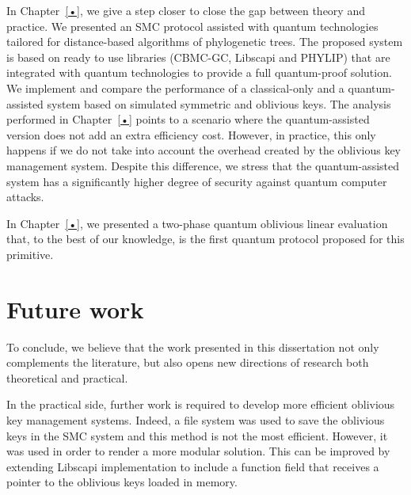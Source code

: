 In Chapter~\ref{•}, we give a step closer to close the gap between theory and practice. We presented an SMC protocol assisted with quantum technologies tailored for distance-based algorithms of phylogenetic trees. The proposed system is based on ready to use libraries (CBMC-GC, Libscapi and PHYLIP) that are integrated with quantum technologies to provide a full quantum-proof solution. We implement and compare the performance of a classical-only and a quantum-assisted system based on simulated symmetric and oblivious keys. The analysis performed in Chapter~\ref{•} points to a scenario where the quantum-assisted version does not add an extra efficiency cost. However, in practice, this only happens if we do not take into account the overhead created by the oblivious key management system. Despite this difference, we stress that the quantum-assisted system has a significantly higher degree of security against quantum computer attacks.

In Chapter~\ref{•}, we presented a two-phase quantum oblivious linear evaluation that, to the best of our knowledge, is the first quantum protocol proposed for this primitive.


\section{Future work}

To conclude, we believe that the work presented in this dissertation not only complements the literature, but also opens new directions of research both theoretical and practical.

In the practical side, further work is required to develop more efficient oblivious key management systems. Indeed, a file system was used to save the oblivious keys in the SMC system and this method is not the most efficient. However, it was used in order to render a more modular solution. This can be improved by extending Libscapi implementation to include a function field that receives a pointer to the oblivious keys loaded in memory. 

